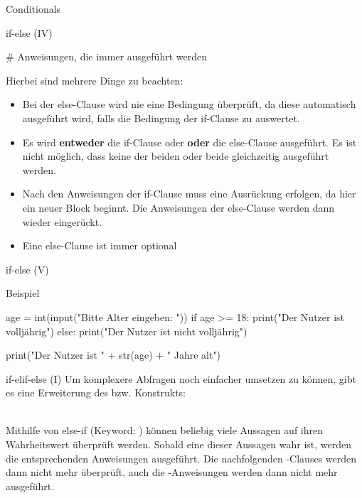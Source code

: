 \begin{subsection}{Conditionals}
\begin{frame}[fragile]{if-else (IV)}
\begin{pythoncode}
# Anweisungen, die immer ausgeführt werden
\end{pythoncode}

            Hierbei sind mehrere Dinge zu beachten:
            
            \begin{itemize}
                \item Bei der else-Clause wird nie eine Bedingung überprüft, da diese automatisch ausgeführt wird, falls die Bedingung der if-Clause zu  auswertet.
                \item Es wird \textbf{entweder} die if-Clause oder \textbf{oder} die else-Clause ausgeführt. Es ist nicht möglich, dass keine der beiden oder  beide gleichzeitig ausgeführt werden.
                \item Nach den Anweisungen der if-Clause muss eine Ausrückung erfolgen, da hier ein neuer Block beginnt. Die Anweisungen der else-Clause werden dann wieder eingerückt.
                \item Eine else-Clause ist immer optional
            \end{itemize}
        
        \end{frame}
        
        \begin{frame}[fragile]{if-else (V)}
            
            \begin{exampleblock}{Beispiel}
            
\begin{pythoncode}
age = int(input("Bitte Alter eingeben: "))
if age >= 18:
    print("Der Nutzer ist volljährig")
else: 
    print("Der Nutzer ist nicht volljährig")

print("Der Nutzer ist " + str(age) + " Jahre alt")
\end{pythoncode}

            \end{exampleblock}
        \end{frame}
        
        
        \begin{frame}[fragile]{if-elif-else (I)}
            Um komplexere Abfragen noch einfacher umsetzen zu können, gibt es eine Erweiterung des  bzw.  Konstrukts:\\~\
            
            Mithilfe von else-if (Keyword: ) können beliebig viele Aussagen auf ihren Wahrheitswert überprüft werden. Sobald eine dieser Aussagen wahr ist, werden die entsprechenden Anweisungen ausgeführt. Die nachfolgenden -Clauses werden dann nicht mehr überprüft, auch die -Anweisungen werden dann nicht mehr ausgeführt. \\~\
            

\end{frame}
\end{subsection}
